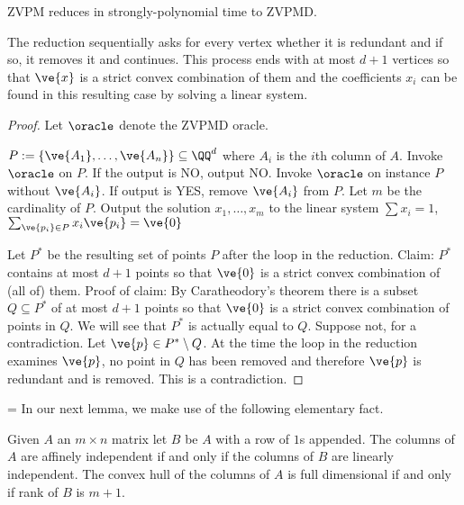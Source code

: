 




\begin{lemma}
ZVPM reduces in strongly-polynomial time to ZVPMD.
\end{lemma}
\begin{proofidea}
The reduction sequentially asks for every vertex whether it is redundant and if so, it removes it and continues. 
This process ends with at most $d+1$ vertices so that $\ve{x}$ is a strict convex combination of them and the coefficients $x_i$ can be found in this resulting case by solving a linear system.
\end{proofidea}

\begin{proof}
Let $\oracle$ denote the ZVPMD oracle.
\begin{algorithmic}
\Require $P:= \{\ve{A_1}, \dotsc, \ve{A_n}\} \subseteq \QQ^d$ where $A_i$ is the $i$th column of $A$.
\State Invoke $\oracle$ on $P$. If the output is NO, output NO.
\State Invoke $\oracle$ on instance $P$ without $\ve{A_i}$. If output is YES, remove $\ve{A_i}$ from $P$.
\EndFor
\State Let $m$ be the cardinality of $P$.
\State Output the solution $x_1, \dotsc, x_m$ to the linear system $\sum x_i = 1$, $\sum_{\ve{p_i} \in P} x_i \ve{p_i} = \ve{0}$
\end{algorithmic}
Let $P^*$ be the resulting set of points $P$ after the loop in the reduction. Claim: $P^*$ contains at most $d+1$ points so that $\ve{0}$ is a strict convex combination of (all of) them.
Proof of claim: 
By Caratheodory's theorem there is a subset $Q \subseteq P^*$ of at most $d+1$ points so that $\ve{0}$ is a strict convex combination of points in $Q$. 
We will see that $P^*$ is actually equal to $Q$. 
Suppose not, for a contradiction. Let $\ve{p} \in P^* \setminus Q$. 
At the time the loop in the reduction examines $\ve{p}$, no point in $Q$ has been removed and therefore $\ve{p}$ is redundant and is removed. 
This is a contradiction.
\end{proof}

\ifnum\version=\stocversion
\else
In our next lemma, we make use of the following elementary fact.
\begin{claim}\label{claim:affine}
Given $A$ an $m \times n$ matrix let $B$ be $A$ with a row of $1$s appended. 
The columns of $A$ are affinely independent if and only if the columns of $B$ are linearly independent. 
The convex hull of the columns of $A$ is full dimensional if and only if rank of $B$ is $m+1$.
\end{claim}
\fi

